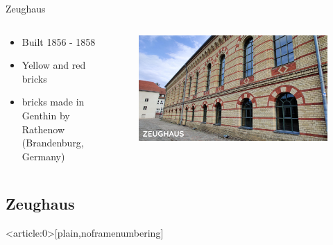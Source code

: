\documentclass[light]{lutbeamer} %
\begin{document}
\begin{frame}{Zeughaus}
    \begin{columns}
    \begin{column}{0.5\textwidth}
            \begin{itemize}
                \item Built 1856 - 1858 \cite{visitberlin}
                \item Yellow and red bricks
                \item bricks made in Genthin by Rathenow (Brandenburg, Germany)
            \end{itemize}
    \end{column}
    \begin{column}{0.5\textwidth}
        \begin{figure}
        \centering
            \vspace*{-2.5cm}
            \includegraphics[trim= 200 0 0 0,clip,height=\paperheight]{figures/zeughaus.jpg}
        \end{figure}
    \end{column}
    \end{columns}
\end{frame}

\subsection{Zeughaus}
{ %
    \begin{frame}<article:0>[plain,noframenumbering]
    \end{frame}
}
\end{document}
